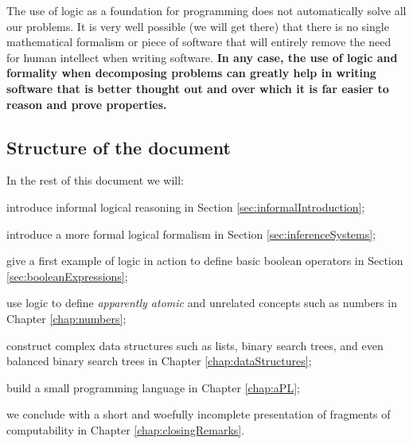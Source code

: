 The use of logic as a foundation for programming does not automatically solve all our problems. It is very well possible (we will get there) that there is no single mathematical formalism or piece of software that will entirely remove the need for human intellect when writing software. \textbf{In any case, the use of logic and formality when decomposing problems can greatly help in writing software that is better thought out and over which it is far easier to reason and prove properties.}

\subsection{Structure of the document}
In the rest of this document we will: 
\begin{inparaenum}
\item introduce informal logical reasoning in Section \ref{sec:informalIntroduction};
\item introduce a more formal logical formalism in Section \ref{sec:inferenceSystems};
\item give a first example of logic in action to define basic boolean operators in Section \ref{sec:booleanExpressions};
\item use logic to define \textit{apparently atomic} and unrelated concepts such as numbers in Chapter \ref{chap:numbers};
\item construct complex data structures such as lists, binary search trees, and even balanced binary search trees in Chapter \ref{chap:dataStructures};
\item build a small programming language in Chapter \ref{chap:aPL};
\item we conclude with a short and woefully incomplete presentation of fragments of computability in Chapter \ref{chap:closingRemarks}.
\end{inparaenum}
